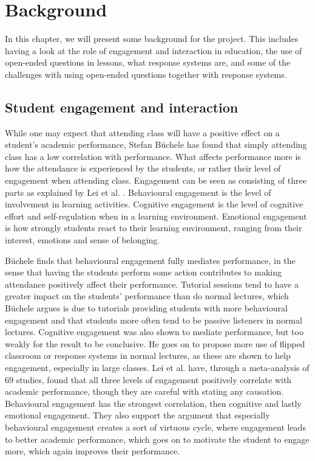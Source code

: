\chapter{Background}\label{chap:background}

In this chapter, we will present some background for the project. This includes having a look at the role of engagement and interaction in education, the use of open-ended questions in lessons, what response systems are, and some of the challenges with using open-ended questions together with response systems.

\section{Student engagement and interaction}
While one may expect that attending class will have a positive effect on a student's academic performance, Stefan Büchele \cite{Buchele2021} has found that simply attending class has a low correlation with performance. What affects performance more is how the attendance is experienced by the students, or rather their level of engagement when attending class. Engagement can be seen as consisting of three parts as explained by Lei et al. \cite{lei2018}. Behavioural engagement is the level of involvement in learning activities. Cognitive engagement is the level of cognitive effort and self-regulation when in a learning environment. Emotional engagement is how strongly students react to their learning environment, ranging from their interest, emotions and sense of belonging.

Büchele \cite{Buchele2021} finds that behavioural engagement fully mediates performance, in the sense that having the students perform some action contributes to making attendance positively affect their performance. Tutorial sessions tend to have a greater impact on the students' performance than do normal lectures, which Büchele argues is due to tutorials providing students with more behavioural engagement and that students more often tend to be passive listeners in normal lectures. Cognitive engagement was also shown to mediate performance, but too weakly for the result to be conclusive. He goes on to propose more use of flipped classroom or response systems in normal lectures, as these are shown to help engagement, especially in large classes. Lei et al. \cite{lei2018} have, through a meta-analysis of 69 studies, found that all three levels of engagement positively correlate with academic performance, though they are careful with stating any causation. Behavioural engagement has the strongest correlation, then cognitive and lastly emotional engagement. They also support the argument that especially behavioural engagement creates a sort of virtuous cycle, where engagement leads to better academic performance, which goes on to motivate the student to engage more, which again improves their performance. 

